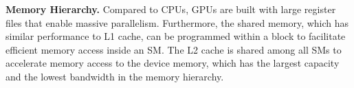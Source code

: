\vspace{1mm}\noindent\textbf{Memory Hierarchy.} Compared to CPUs, GPUs are built with large register files that enable massive parallelism. 
Furthermore, the shared memory, which has similar performance to L1 cache, can be programmed within a block to facilitate efficient memory access inside an SM.
The L2 cache is shared among all SMs to accelerate memory access to the device memory, which has the largest capacity and the lowest bandwidth in the memory hierarchy.



